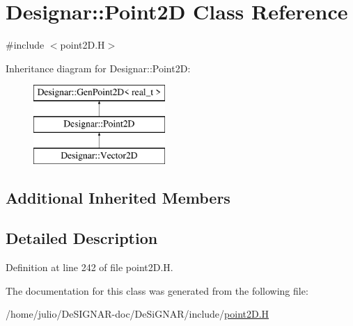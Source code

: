 \hypertarget{class_designar_1_1_point2_d}{}\section{Designar\+:\+:Point2D Class Reference}
\label{class_designar_1_1_point2_d}


{\ttfamily \#include $<$point2\+D.\+H$>$}

Inheritance diagram for Designar\+:\+:Point2D\+:\begin{figure}[H]
\begin{center}
\leavevmode
\includegraphics[height=3.000000cm]{class_designar_1_1_point2_d}
\end{center}
\end{figure}
\subsection*{Additional Inherited Members}


\subsection{Detailed Description}


Definition at line 242 of file point2\+D.\+H.



The documentation for this class was generated from the following file\+:\begin{DoxyCompactItemize}
\item 
/home/julio/\+De\+S\+I\+G\+N\+A\+R-\/doc/\+De\+Si\+G\+N\+A\+R/include/\hyperlink{point2_d_8_h}{point2\+D.\+H}\end{DoxyCompactItemize}
